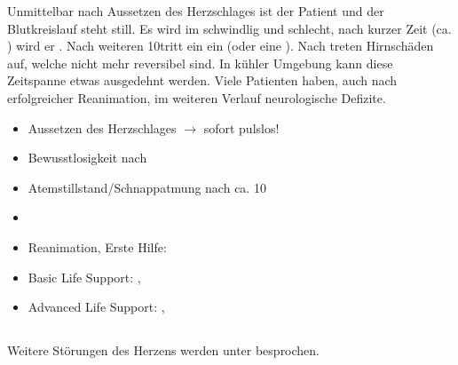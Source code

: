 {Unmittelbar nach Aussetzen des Herzschlages ist der Patient
 und der Blutkreislauf steht still. Es wird im
schwindlig und schlecht, nach kurzer Zeit (ca.
\Sek*) wird er . Nach weiteren
10\Sek* tritt ein  ein (oder eine
).
Nach \Min* treten Hirnschäden auf, welche nicht
mehr reversibel sind. In kühler Umgebung kann diese
Zeitspanne etwas ausgedehnt werden.
Viele Patienten haben, auch nach erfolgreicher Reanimation,
im weiteren Verlauf neurologische Defizite.
}{
\begin{itemize}
  \item Aussetzen des Herzschlages $\rightarrow$ 
  sofort pulslos!
  \item[\Sign{→}] Bewusstlosigkeit nach \Sek*
  \item[\Sign{→}] Atemstillstand/Schnappatmung nach ca. 10\Sek*
  \item[\Sign{→}] 
\end{itemize}

}{}{}{}




{\TxQuerverweise}
{\begin{itemize}
  \item Reanimation, Erste Hilfe:
  \item Basic Life Support:
  \CO{[BLS]}, 
  \item Advanced Life Support: \CO{[ALS]},
\end{itemize}}
{}
{}
{}
{}




\subsection{}

Weitere Störungen des Herzens werden 
unter  besprochen. 






\clearpage %

